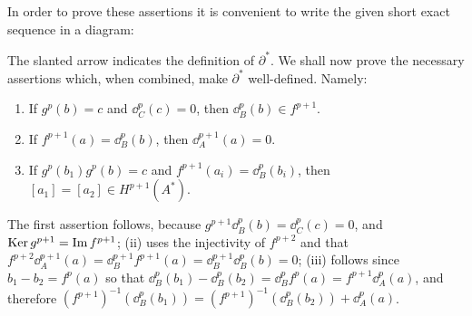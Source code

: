 In order to prove these assertions it is convenient to write the given short exact
sequence in a diagram:


\begin{center}
\end{center}

The slanted arrow indicates the definition of $\partial^*$. We shall now prove the necessary
assertions which, when combined, make $\partial^*$ well-defined. Namely:
\begin{enumerate}[label=(\roman*)]
  \item If $g^p(b) = c$  and $\dd^p_C(c) = 0$, then $\dd^p_B(b) \in f^{p+1}$.
  \item If $f^{p+1}(a) = \dd^p_B(b)$, then $\dd^{p+1}_A(a) = 0$.
  \item If $g^p(b_1)  g^p(b) = c$ and $f^{p+1}(a_i) = \dd^p_B(b_i)$, then $[a_1]=[a_2] \in H^{p+1}(A^*)$.
\end{enumerate}



The first assertion follows, because $g^{p+1}\dd^p_B(b) = \dd^p_C(c) = 0$, and $\operatorname{Ker} g^{p+1} = \operatorname{Im} f^{p+1}$;
(ii) uses the injectivity of $f^{p+2}$ and that $f^{p+2}\dd^{p+1}_A(a) = \dd^{p+1}_Bf^{p+1}(a) = \dd^{p+1}_B\dd^p_B(b) = 0$;
(iii) follows since $b_1-b_2 = f^p(a)$ so that $\dd^p_B(b_1) - \dd^p_B(b_2) = \dd^p_Bf^p(a) = f^{p+1}\dd^p_A(a)$, 
and therefore $(f^{p+1})^{-1}(\dd^p_B(b_1)) = (f^{p+1})^{-1} (\dd^p_B(b_2)) + \dd^p_A(a)$.

